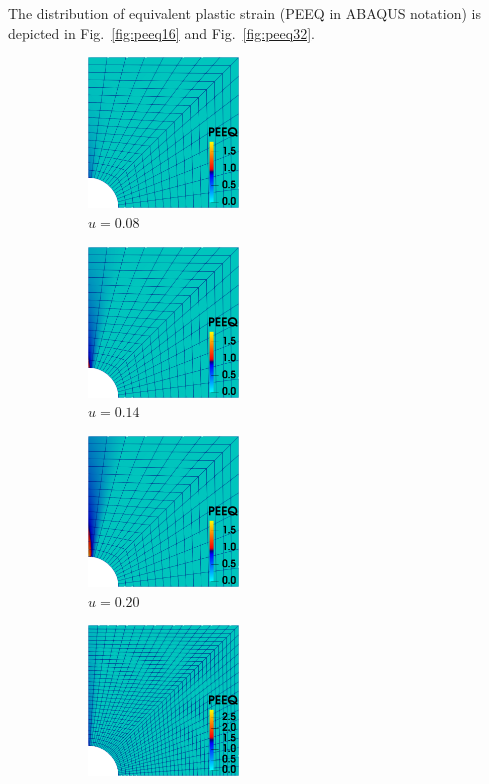\documentclass[3p,sort&compress,11pt,fleqn,review]{elsarticle}
\newcommand*{\figref}[1]{Fig.~\ref{#1}}
\begin{document}
The distribution of equivalent plastic strain (PEEQ in ABAQUS notation) is depicted in \figref{fig:peeq16} and \figref{fig:peeq32}.
\begin{figure}[ht]
\centering\footnotesize
\begin{subfigure}[b]{.33\textwidth}\centering
\includegraphics[width=4cm]{PIC/P1640}
\caption{$u=\num{0.08}$}
\end{subfigure}\hfill
\begin{subfigure}[b]{.33\textwidth}\centering
\includegraphics[width=4cm]{PIC/P1670}
\caption{$u=\num{0.14}$}
\end{subfigure}\hfill
\begin{subfigure}[b]{.33\textwidth}\centering
\includegraphics[width=4cm]{PIC/P16100}
\caption{$u=\num{0.20}$}
\end{subfigure}
\caption{distribution of equivalent plastic strain (16 elements per edge)}\label{fig:peeq16}
\begin{subfigure}[b]{.33\textwidth}\centering
\includegraphics[width=4cm]{PIC/P3240}

\end{subfigure}
\end{figure}
\end{document}
